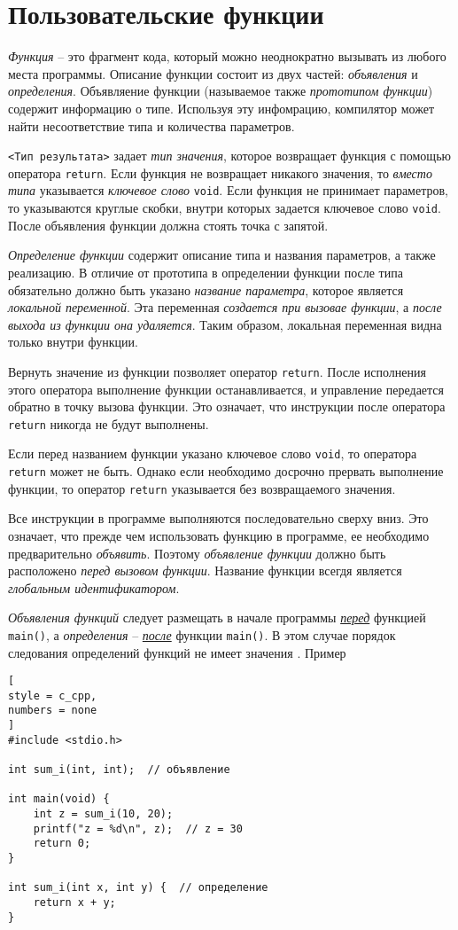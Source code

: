 \documentclass[%
	11pt,
	a4paper,
	utf8,
		]{article}
\begin{document}
\section{Пользовательские функции}

\emph{Функция} -- это фрагмент кода, который можно неоднократно вызывать из любого места программы. Описание функции состоит из двух частей: \emph{объявления} и \emph{определения}. Объявляение функции (называемое также \emph{прототипом функции}) содержит информацию о типе. Используя эту инфомрацию, компилятор может найти несоответствие типа и количества параметров.

\verb|<Тип результата>| задает \emph{тип значения}, которое возвращает функция с помощью оператора \verb|return|. Если функция не возвращает никакого значения, то \emph{вместо типа} указывается \emph{ключевое слово} \verb|void|. Если функция не принимает параметров, то указываются круглые скобки, внутри которых задается ключевое слово \verb|void|. После объявления функции должна стоять точка с запятой.

\emph{Определение функции} содержит описание типа и названия параметров, а также реализацию. В отличие от прототипа в определении функции после типа обязательно должно быть указано \emph{название параметра}, которое является \emph{локальной переменной}. Эта переменная \emph{создается при вызовае функции}, а \emph{после выхода из функции она удаляется}. Таким образом, локальная переменная видна только внутри функции.

Вернуть значение из функции позволяет оператор \verb|return|. После исполнения этого оператора выполнение функции останавливается, и управление передается обратно в точку вызова функции. Это означает, что инструкции после оператора \verb|return| никогда не будут выполнены.

Если перед названием функции указано ключевое слово \verb|void|, то оператора \verb|return| может не быть. Однако если необходимо досрочно прервать выполнение функции, то оператор \verb|return| указывается без возвращаемого значения.

Все инструкции в программе выполняются последовательно сверху вниз. Это означает, что прежде чем использовать функцию в программе, ее необходимо предварительно \emph{объявить}. Поэтому \emph{объявление функции} должно быть расположено \emph{перед вызовом функции}. Название функции всегдя является \emph{глобальным идентификатором}.

\emph{Объявления функций} следует размещать в начале программы \underline{\itshape перед} функцией \verb|main()|, а \emph{определения} -- \underline{\itshape после} функции \verb|main()|. В этом случае порядок следования определений функций не имеет значения \cite[]{prokhorenok-prog-c:2020}. Пример
\begin{lstlisting}[
style = c_cpp,
numbers = none
]
#include <stdio.h>

int sum_i(int, int);  // объявление

int main(void) {
    int z = sum_i(10, 20);
    printf("z = %d\n", z);  // z = 30
    return 0;
}

int sum_i(int x, int y) {  // определение
    return x + y;
}
\end{lstlisting}
\end{document}
